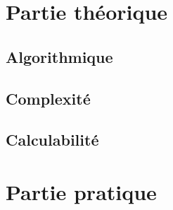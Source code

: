 \documentclass[a4paper,french,towsides,10pt]{book}
\newcommand{\clearemptydoublepage}{%
	\newpage{\pagestyle{empty}\cleardoublepage}}
\begin{document}
\renewcommand{\labelitemii}{\textasteriskcentered}

\clearemptydoublepage
\tableofcontents
\clearemptydoublepage
\chapter{Partie théorique}

\section{Algorithmique}

\newpage
\section{Complexité}

\newpage
\section{Calculabilité}

\clearemptydoublepage
\chapter{Partie pratique}

\end{document}
